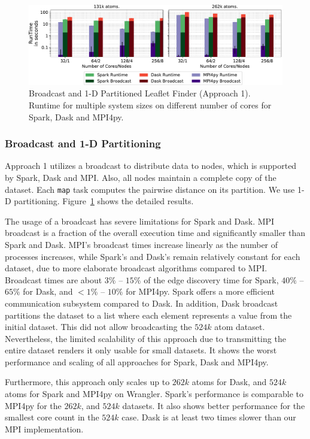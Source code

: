 \begin{figure}[t]
    \centering
    \includegraphics[width=.75\textwidth]{figures/data_analytics_hpc/task_par/spark_dask_lf_approach1.pdf}
    \caption{Broadcast and 1-D Partitioned Leaflet Finder (Approach 1).
    Runtime for multiple system sizes on different number of cores for Spark, Dask and MPI4py.}
    \label{fig:WranglerLeafLetFinderApp1}
\end{figure}

\subsubsection*{Broadcast and 1-D Partitioning}
Approach 1 utilizes a broadcast to distribute data to nodes, which is supported by Spark, Dask and MPI.
Also, all nodes maintain a complete copy of the dataset.
Each \texttt{map} task computes the pairwise distance on its partition.
We use 1-D partitioning.
Figure~\ref{fig:WranglerLeafLetFinderApp1} shows the detailed results.

The usage of a broadcast has severe limitations for Spark and Dask.
MPI broadcast is a fraction of the overall execution time and significantly smaller than Spark and Dask.
MPI's broadcast times increase linearly as the number of processes increases, while Spark's and Dask's remain relatively constant for each dataset, due to more elaborate broadcast algorithms compared to MPI.
Broadcast times are about $3\%$ -- $15\%$ of the edge discovery time for Spark, $40\%$ -- $65\%$ for Dask, and $<1\%$ -- $10\%$ for MPI4py.
Spark offers a more efficient communication subsystem compared to Dask.
In addition, Dask broadcast partitions the dataset to a list where each element represents a value from the initial dataset.
This did not allow broadcasting the $524k$ atom dataset.
Nevertheless, the limited scalability of this approach due to transmitting the entire dataset renders it only usable for small datasets.
It shows the worst performance and scaling of all approaches for Spark, Dask and MPI4py.

Furthermore, this approach only scales up to $262k$ atoms for Dask, and $524k$ atoms for Spark and MPI4py on Wrangler.
Spark's performance is comparable to MPI4py for the $262k$, and $524k$ datasets.
It also shows better performance for the smallest core count in the $524k$ case.
Dask is at least two times slower than our MPI implementation.

